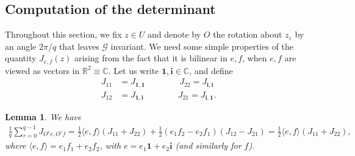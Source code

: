 \documentclass[11pt]{article}
\newtheorem{lemma}[theorem]{Lemma}
\theoremstyle{remark}
\def\eps{\varepsilon}
\def\C{\mathbb{C}}
\def\R{\mathbb{R}}
\def\cG{\mathcal{G}}
\newcommand{\eqnsplst}[1]{\begin{equation*}\begin{split}%
   #1\end{split}\end{equation*}}
\begin{document}
\subsection{Computation of the determinant}
\label{ssec:comp-det}

Throughout this section, we fix $z \in U$ and denote by $O$ the rotation about $z_\eps$ 
by an angle $2\pi/q$ that leaves $\cG$ invariant.
We need some simple properties of the quantity $J_{e, f}(z)$ arising from the fact that 
it is bilinear in $e, f$, 
when $e, f$ are viewed as vectors in $\R^2 \equiv \C$. Let us write 
$\mathbf{1}, \mathbf{i} \in \C$, and define
\eqnsplst{
 J_{11} &= J_{\mathbf{1}, \mathbf{1}} \qquad\qquad J_{22} = J_{\mathbf{i}, \mathbf{i}} \\
 J_{12} &= J_{\mathbf{1}, \mathbf{i}} \qquad\qquad J_{21} = J_{\mathbf{i}, \mathbf{1}}. }
 
\begin{lemma}
\label{lem:Javrg}
We have
\eqnsplst{
 \frac{1}{q} \sum_{r=0}^{q-1} J_{O^r e, O^r f} 
 = \frac{1}{2} \langle e, f \rangle (J_{11} + J_{22})
   + \frac{1}{2} (e_1 f_2 - e_2 f_1) (J_{12} - J_{21})
 = \frac{1}{2} \langle e, f \rangle (J_{11} + J_{22}), }
where $\langle e, f \rangle = e_1 f_1 + e_2 f_2$, with $e = e_1 \mathbf{1} + e_2 \mathbf{i}$ (and similarly 
for $f$).
\end{lemma}
\end{document}
